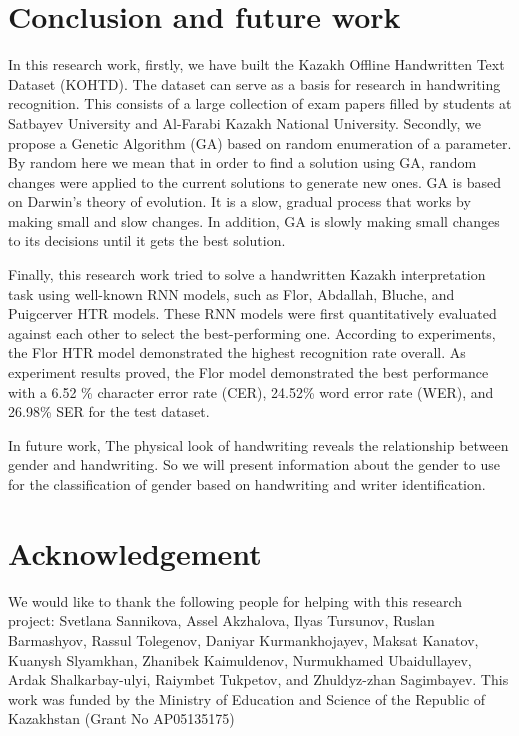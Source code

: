 \documentclass[preprint,12pt]{elsarticle}
\begin{document}
\section{Conclusion and future work}
\label{section:Conclusion}
In this research work, firstly, we have built the Kazakh Offline Handwritten Text Dataset (KOHTD). The dataset can serve as a basis for research in handwriting recognition. This consists of a large collection of exam papers filled by students at Satbayev University and Al-Farabi Kazakh National University. Secondly, we propose a Genetic Algorithm (GA) based on random enumeration of a parameter. By random here we mean that in order to find a solution using GA, random changes were applied to the current solutions to generate new ones. GA is based on Darwin's theory of evolution. It is a slow, gradual process that works by making small and slow changes. In addition, GA is slowly making small changes to its decisions until it gets the best solution.

Finally, this research work tried to solve a handwritten Kazakh interpretation task using well-known RNN models, such as Flor, Abdallah, Bluche, and Puigcerver HTR models. These RNN models were first quantitatively evaluated against each other to select the best-performing one. According to experiments, the Flor HTR model demonstrated the highest recognition rate overall. As experiment results proved, the Flor model demonstrated the best performance with a 6.52 \% character error rate (CER), 24.52\% word error rate (WER), and 26.98\% SER for the test dataset.

In future work, The physical look of handwriting reveals the relationship between gender and handwriting. So we will present information about the gender to use for the classification of gender based on handwriting and writer identification.

\section{Acknowledgement}
We would like to thank the following people for helping with this research project:
Svetlana Sannikova,
Assel Akzhalova,
Ilyas Tursunov,
Ruslan Barmashyov,
Rassul Tolegenov,
Daniyar Kurmankhojayev,
Maksat Kanatov,
Kuanysh Slyamkhan,
Zhanibek Kaimuldenov,
Nurmukhamed Ubaidullayev,
Ardak Shalkarbay-ulyi,
Raiymbet Tukpetov, 
and
Zhuldyz-zhan Sagimbayev.
This work was funded by the Ministry of Education and Science of the Republic of Kazakhstan (Grant No AP05135175)

  
 
\end{document}
